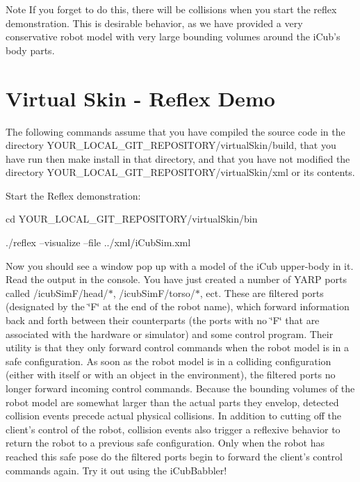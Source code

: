 \begin{DoxyNote}{Note}
If you forget to do this, there will be collisions when you start the reflex demonstration. This is desirable behavior, as we have provided a very conservative robot model with very large bounding volumes around the iCub's body parts.
\end{DoxyNote}
\hypertarget{run_first_time_skin}{}\section{Virtual Skin -\/ Reflex Demo}\label{run_first_time_skin}
The following commands assume that you have compiled the source code in the directory {\ttfamily YOUR\_\-LOCAL\_\-GIT\_\-REPOSITORY/virtualSkin/build}, that you have run  then {\ttfamily make} {\ttfamily install} in that directory, and that you have not modified the directory {\ttfamily YOUR\_\-LOCAL\_\-GIT\_\-REPOSITORY/virtualSkin/xml} or its contents.

Start the Reflex demonstration: \begin{DoxyVerb}cd YOUR_LOCAL_GIT_REPOSITORY/virtualSkin/bin \end{DoxyVerb}
 \begin{DoxyVerb}./reflex --visualize --file ../xml/iCubSim.xml \end{DoxyVerb}
 Now you should see a window pop up with a model of the iCub upper-\/body in it. Read the output in the console. You have just created a number of YARP ports called {\ttfamily /icubSimF/head/$\ast$}, {\ttfamily /icubSimF/torso/$\ast$}, ect. These are filtered ports (designated by the \char`\"{}F\char`\"{} at the end of the robot name), which forward information back and forth between their counterparts (the ports with no \char`\"{}F\char`\"{} that are associated with the hardware or simulator) and some control program. Their utility is that they only forward control commands when the robot model is in a safe configuration. As soon as the robot model is in a colliding configuration (either with itself or with an object in the environment), the filtered ports no longer forward incoming control commands. Because the bounding volumes of the robot model are somewhat larger than the actual parts they envelop, detected collision events precede actual physical collisions. In addition to cutting off the client's control of the robot, collision events also trigger a reflexive behavior to return the robot to a previous safe configuration. Only when the robot has reached this safe pose do the filtered ports begin to forward the client's control commands again. Try it out using the iCubBabbler!

